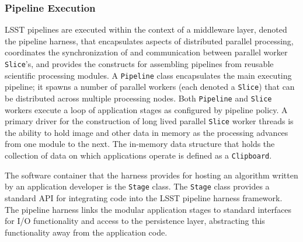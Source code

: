 
\subsubsection{Pipeline Execution}

LSST pipelines are executed within the context of a middleware layer, denoted the
pipeline harness, that encapsulates aspects of distributed parallel
processing, coordinates the synchronization of and communication
between parallel worker {\tt Slice}'s,
and provides the constructs for assembling pipelines from
reusable scientific processing modules.
A {\tt Pipeline} class encapsulates the main executing pipeline;
it spawns a number of parallel workers (each denoted a {\tt Slice})
that can be distributed across multiple processing nodes. Both {\tt Pipeline}
and {\tt Slice} workers execute a loop of application stages
as configured by pipeline policy.
A primary driver for the construction of long lived parallel {\tt Slice}
worker threads is the ability to hold image and other data in memory
as the processing advances from one module to the next. The in-memory
data structure that holds the collection of data on which
applications operate is defined as a {\tt Clipboard}.

The software container that the harness provides for hosting an algorithm written
by an application developer is the {\tt Stage} class.
The {\tt Stage} class provides a standard API
for integrating code into the LSST pipeline harness framework.
The pipeline harness links the modular application stages to standard interfaces for
I/O functionality and access to the persistence layer, abstracting this functionality
away from the application code.



